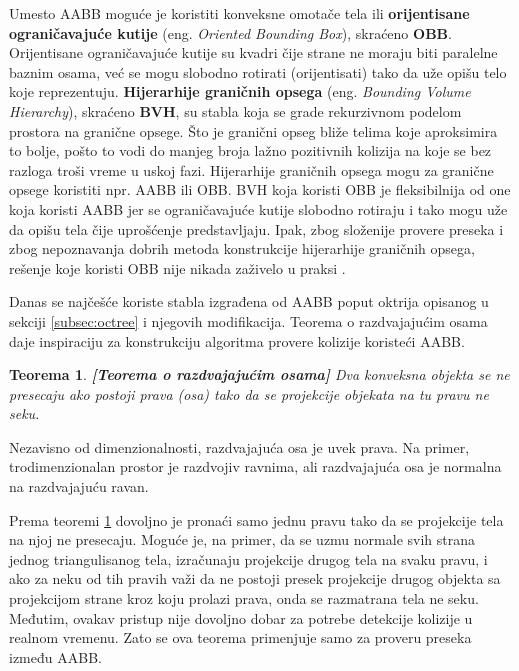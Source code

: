 \documentclass[12pt,oneside]{memoir}
\newtheorem{teo}{Teorema}[section]
\begin{document}
Umesto AABB moguće je koristiti konveksne omotače tela ili \textbf{orijentisane ograničavajuće kutije} (eng. {\em Oriented Bounding Box}), skraćeno \textbf{OBB}.
Orijentisane ograničavajuće kutije su kvadri čije strane ne moraju biti paralelne baznim osama, 
već se mogu slobodno rotirati (orijentisati) tako da uže opišu telo koje reprezentuju.
\textbf{Hijerarhije graničnih opsega} (eng. {\em Bounding Volume Hierarchy}), skraćeno \textbf{BVH}, su stabla koja se grade rekurzivnom podelom 
prostora na granične opsege. Što je granični opseg bliže telima koje aproksimira to bolje, pošto to vodi do manjeg broja 
lažno pozitivnih kolizija na koje se bez razloga troši vreme u uskoj fazi. 
Hijerarhije graničnih opsega mogu za granične opsege koristiti npr. AABB ili OBB.
BVH koja koristi OBB je fleksibilnija od one koja koristi AABB jer se ograničavajuće kutije slobodno rotiraju 
i tako mogu uže da opišu tela čije uprošćenje predstavljaju. 
Ipak, zbog složenije provere preseka i zbog nepoznavanja dobrih metoda konstrukcije hijerarhije graničnih
opsega, rešenje koje koristi OBB nije nikada zaživelo u praksi \cite{obb}. 

Danas se najčešće koriste stabla izgrađena od AABB poput oktrija opisanog u sekciji \ref{subsec:octree} i njegovih modifikacija. 
Teorema o razdvajajućim osama daje inspiraciju za konstrukciju algoritma provere kolizije koristeći AABB.

\begin{teo}
	\textbf{[Teorema o razdvajajućim osama]}
	\label{teo:sat}
	Dva konveksna objekta se ne presecaju ako postoji prava (osa) 
	tako da se projekcije objekata na tu pravu ne seku.
\end{teo}

Nezavisno od dimenzionalnosti, razdvajajuća osa je uvek prava. Na primer, trodimenzionalan prostor
je razdvojiv ravnima, ali razdvajajuća osa je normalna na razdvajajuću ravan.

Prema teoremi \ref{teo:sat} dovoljno je pronaći samo jednu pravu tako da se projekcije tela na njoj ne presecaju.
Moguće je, na primer, da se uzmu normale svih strana jednog triangulisanog tela, izračunaju projekcije drugog 
tela na svaku pravu, i ako za neku od tih pravih važi da ne postoji presek projekcije drugog objekta sa projekcijom strane kroz koju prolazi prava, onda se razmatrana tela ne seku.
Međutim, ovakav pristup nije dovoljno dobar za potrebe detekcije kolizije u realnom vremenu. 
Zato se  ova teorema primenjuje samo za proveru preseka između AABB.
\end{document}
